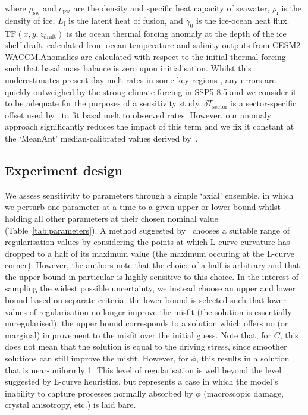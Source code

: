\documentclass[journal abbreviation, manuscript]{copernicus}
\begin{document}
\noindent where $\rho_{\text{sw}}$ and $c_{\text{pw}}$ are the density and specific heat capacity of seawater, $\rho_\text{i}$ is the density of ice, $L_\text{f}$ is the latent heat of fusion, and $\gamma_0$ is the ice-ocean heat flux. $\text{TF}(x, y, z_{\text{draft}})$ is the ocean thermal forcing anomaly at the depth of the ice shelf draft, calculated from ocean temperature and salinity outputs from CESM2-WACCM.\@ Anomalies are calculated with respect to the initial thermal forcing such that basal mass balance is zero upon initialisation. Whilst this underestimates present-day melt rates in some key regions \citep{adusumilliInterannualVariationsMeltwater2020}, any errors are quickly outweighed by the strong climate forcing in SSP5-8.5 and we consider it to be adequate for the purposes of a sensitivity study. $\delta T_{\text{sector}}$ is a sector-specific offset used by~\cite{jourdainProtocolCalculatingBasal2020b} to fit basal melt to observed rates. However, our anomaly approach significantly reduces the impact of this term and we fix it constant at the `MeanAnt' median-calibrated values derived by~\cite{jourdainProtocolCalculatingBasal2020b}.

\subsection{Experiment design}\label{sec:experiment_design}

We assess sensitivity to parameters through a simple `axial' ensemble, in which we perturb one parameter at a time to a given upper or lower bound whilst holding all other parameters at their chosen nominal value (Table~\ref{tab:parameters}). A method suggested by~\cite{wolovickRegularizationLcurvesIce2023} chooses a suitable range of regularisation values by considering the points at which L-curve curvature has dropped to a half of its maximum value (the maximum occuring at the L-curve corner). However, the authors note that the choice of a half is arbitrary and that the upper bound in particular is highly sensitive to this choice. In the interest of sampling the widest possible uncertainty, we instead choose an upper and lower bound based on separate criteria: the lower bound is selected such that lower values of regularisation no longer improve the misfit (the solution is essentially unregularised); the upper bound corresponds to a solution which offers no (or marginal) improvement to the misfit over the initial guess. Note that, for $C$, this does not mean that the solution is equal to the driving stress, since smoother solutions can still improve the misfit. However, for $\phi$, this results in a solution that is near-uniformly 1. This level of regularisation is well beyond the level suggested by L-curve heuristics, but represents a case in which the model's inability to capture processes normally absorbed by $\phi$ (macroscopic damage, crystal anisotropy, etc.) is laid bare.
\end{document}
